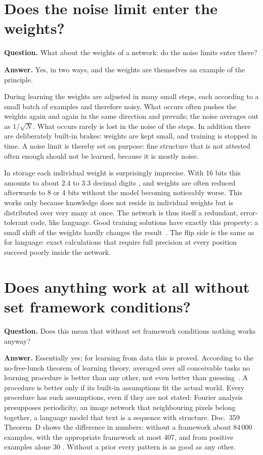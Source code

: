 \section{Does the noise limit enter the weights?}

\textbf{Question.} What about the weights of a network: do the noise limits enter there?

\textbf{Answer.} Yes, in two ways, and the weights are themselves an example of the principle.

During learning the weights are adjusted in many small steps, each according to a small batch of
examples and therefore noisy. What occurs often pushes the weights again and again in the same
direction and prevails; the noise averages out as $1/\sqrt N$. What occurs rarely is lost in the noise
of the steps. In addition there are deliberately built-in brakes: weights are kept small, and training
is stopped in time. A noise limit is thereby set on purpose: fine structure that is not attested often
enough should not be learned, because it is mostly noise.

In storage each individual weight is surprisingly imprecise. With 16 bits this amounts to about $2.4$
to $3.3$ decimal digits \KM, and weights are often reduced afterwards to 8 or 4 bits without the model
becoming noticeably worse. This works only because knowledge does not reside in individual weights but
is distributed over very many at once. The network is thus itself a redundant, error-tolerant code,
like language. Good training solutions have exactly this property: a small shift of the weights
hardly changes the result \QM\,\cite{Hochreiter1997}. The flip side is the same as for language: exact
calculations that require full precision at every position succeed poorly inside the network.

\section{Does anything work at all without set framework conditions?}

\textbf{Question.} Does this mean that without set framework conditions nothing works anyway?

\textbf{Answer.} Essentially yes; for learning from data this is proved. According to the
no-free-lunch theorem of learning theory, averaged over all conceivable tasks no learning procedure is
better than any other, not even better than guessing \QM\,\cite{Wolpert1996}. A procedure is better
only if its built-in assumptions fit the actual world. Every procedure has such assumptions, even if
they are not stated: Fourier analysis presupposes periodicity, an image network that neighbouring
pixels belong together, a language model that text is a sequence with structure. Doc.~359
Theorem~D shows the difference in numbers: without a framework about 84\,000 examples, with the
appropriate framework at most 407, and from positive examples alone 30 \KM. Without a prior every
pattern is as good as any other.

